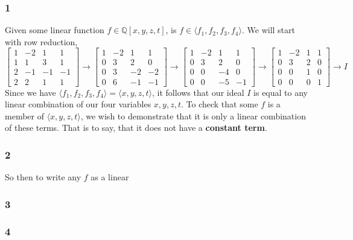 \documentclass{article}
\theoremstyle{definition}
\begin{document}
\subsubsection*{1}
Given some linear function $f \in \mathbb{Q}[x,y,z,t]$, is $f \in \langle f_1,f_2,f_3,f_4\rangle$.
We will start with row reduction,
\[
    \begin{bmatrix}
        1 & -2 & 1 & 1 \\
        1 & 1 & 3 & 1 \\
        2 & -1 & -1 & -1 \\
        2 & 2 & 1 & 1
    \end{bmatrix}   
    \to 
    \begin{bmatrix}
        1 & -2 & 1 & 1 \\
        0 & 3 & 2 & 0 \\
        0 & 3 & -2 & -2 \\
        0 & 6 & -1 & -1
    \end{bmatrix} 
    \to 
    \begin{bmatrix}
        1 & -2 & 1 & 1 \\
        0 & 3 & 2 & 0 \\
        0 & 0 & -4 & 0 \\
        0 & 0 & -5 & -1 
    \end{bmatrix}
    \to 
    \begin{bmatrix}
        1 & -2 & 1 & 1 \\
        0 & 3 & 2 & 0 \\
        0 & 0 & 1 & 0 \\
        0 & 0 & 0 & 1 
    \end{bmatrix}
    \to 
    I
\]
Since we have $\langle f_1, f_2, f_3, f_4\rangle = \langle x,y,z,t\rangle$,
it follows that our ideal $I$ is equal to any linear combination of our four variables 
$x,y,z,t$. To check that some $f$ is a member of $\langle x,y,z,t \rangle$,
we wish to demonstrate that it is only a linear combination of these terms. 
That is to say, that it does not have a \textbf{constant term}.
\subsubsection*{2}
So then to write any $f$ as a linear
\subsubsection*{3}
\subsubsection*{4}
\end{document}

